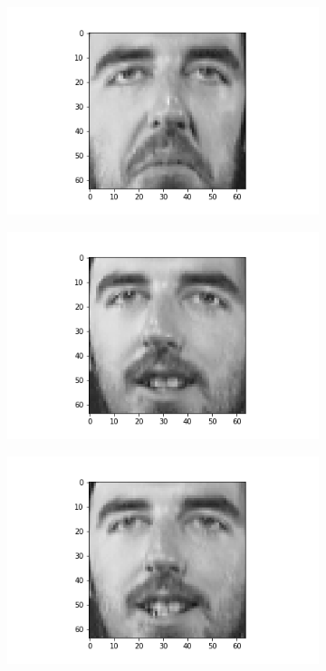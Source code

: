 \documentclass[12pt, a4paper]{article}
\begin{document}
\begin{figure}[h]
    \begin{subfigure}{0.3\linewidth}
        \centering
        \includegraphics[width=\linewidth]{images/q3/c/9/0.png}
    \end{subfigure}
    \hfill
    \begin{subfigure}{0.3\linewidth}
        \centering
        \includegraphics[width=\linewidth]{images/q3/c/9/1.png}
    \end{subfigure}
    \hfill
    \begin{subfigure}{0.3\linewidth}
        \centering
        \includegraphics[width=\linewidth]{images/q3/c/9/2.png}

\end{subfigure}
\end{figure}
\end{document}
